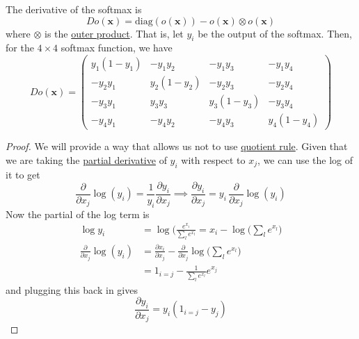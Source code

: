   \begin{lemma}
    \label{thm:derivative-of-softmax}
    The derivative of the softmax is 
    \begin{equation}
      D o (\mathbf{x}) = \mathrm{diag}(o (\mathbf{x})) - o (\mathbf{x}) \otimes o (\mathbf{x})
    \end{equation}
    where $\otimes$ is the \hyperref[lin-def:outer-product]{outer product}. That is, let $y_i$ be the output of the softmax. Then, for the $4 \times 4$ softmax function, we have 
    \begin{equation}
      D o(\mathbf{x}) = \begin{pmatrix} y_1 (1 - y_1) & - y_1 y_2 & -y_1 y_3 & - y_1 y_4 \\ -y_2 y_1 & y_2 (1 - y_2) & - y_2 y_3 & - y_2 y_4 \\ -y_3 y_1 & y_3 y_3 & y_3 (1 - y_3) & -y_3 y_4 \\ -y_4 y_1 & -y_4 y_2 & -y_4 y_3 & y_4 (1 - y_4) \end{pmatrix}
    \end{equation}
  \end{lemma}
  \begin{proof}
    We will provide a way that allows us not to use \hyperref[mv-thm:quotient-rule]{quotient rule}. Given that we are taking the \hyperref[mv-def:partial-derivative]{partial derivative} of $y_i$ with respect to $x_j$, we can use the log of it to get 
    \begin{equation}
      \frac{\partial}{\partial x_j} \log (y_i) = \frac{1}{y_i} \frac{\partial y_i}{\partial x_j} \implies \frac{\partial y_i}{\partial x_j} = y_i \, \frac{\partial}{\partial x_j} \log(y_i)
    \end{equation}
    Now the partial of the log term is 
    \begin{align}
      \log{y_i} & = \log \bigg( \frac{e^{x_i}}{\sum_l e^{x_l}} = x_i - \log \bigg( \sum_l e^{x_l}\bigg) \\
      \frac{\partial}{\partial x_j} \log(y_i) & = \frac{\partial x_i}{\partial x_j} - \frac{\partial}{\partial x_j} \log \bigg( \sum_l e^{x_l}\bigg) \\
      & = 1_{i = j} - \frac{1}{\sum_l e^{x_l}} e^{x_j}
    \end{align}
    and plugging this back in gives 
    \begin{equation}
      \frac{\partial y_i}{\partial x_j} = y_i (1_{i = j} - y_j)
    \end{equation}
  \end{proof} 


